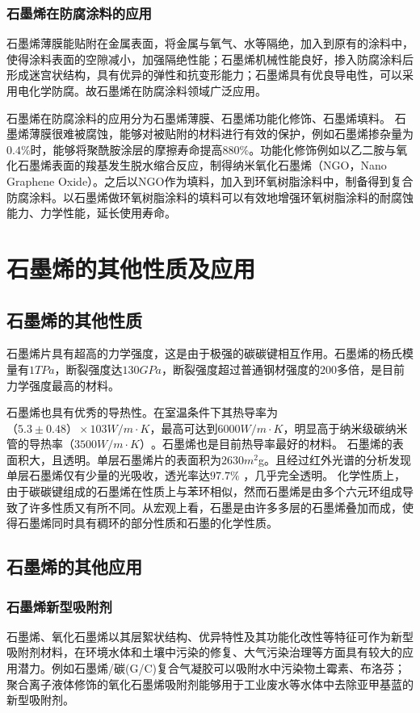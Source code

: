 \subsubsection{石墨烯在防腐涂料的应用}
石墨烯薄膜能贴附在金属表面，将金属与氧气、水等隔绝，加入到原有的涂料中，使得涂料表面的空隙减小，加强隔绝性能；石墨烯机械性能良好，掺入防腐涂料后形成迷宫状结构，具有优异的弹性和抗变形能力；石墨烯具有优良导电性，可以采用电化学防腐。故石墨烯在防腐涂料领域广泛应用。 \par
石墨烯在防腐涂料的应用分为石墨烯薄膜、石墨烯功能化修饰、石墨烯填料。
石墨烯薄膜很难被腐蚀，能够对被贴附的材料进行有效的保护，例如石墨烯掺杂量为$0.4\%$时，能够将聚酰胺涂层的摩擦寿命提高$880\%$。功能化修饰例如以乙二胺与氧化石墨烯表面的羧基发生脱水缩合反应，制得纳米氧化石墨烯（NGO，Nano Graphene Oxide）。之后以NGO作为填料，加入到环氧树脂涂料中，制备得到复合防腐涂料。以石墨烯做环氧树脂涂料的填料可以有效地增强环氧树脂涂料的耐腐蚀能力、力学性能，延长使用寿命。\cite{ref4} \par

\section{石墨烯的其他性质及应用}
\subsection{石墨烯的其他性质}
石墨烯片具有超高的力学强度，这是由于极强的碳碳键相互作用。石墨烯的杨氏模量有$1TPa$\cite{ref5}，断裂强度达$130GPa$，断裂强度超过普通钢材强度的$200$多倍\cite{ref6}，是目前力学强度最高的材料。\par
石墨烯也具有优秀的导热性。在室温条件下其热导率为$（5.3±0.48）×103 W/m \cdot K$，最高可达到$6000 W/m \cdot K$\cite{ref7}，明显高于纳米级碳纳米管的导热率$（3500  W/m \cdot K）$。石墨烯也是目前热导率最好的材料。
石墨烯的表面积大，且透明。单层石墨烯片的表面积为$2630m^{2}$g。且经过红外光谱的分析发现单层石墨烯仅有少量的光吸收，透光率达$97.7\%$ \cite{ref8,ref9}，几乎完全透明。
化学性质上，由于碳碳键组成的石墨烯在性质上与苯环相似，然而石墨烯是由多个六元环组成导致了许多性质又有所不同。从宏观上看，石墨是由许多多层的石墨烯叠加而成，使得石墨烯同时具有稠环的部分性质和石墨的化学性质。\par

\subsection{石墨烯的其他应用}
\subsubsection{石墨烯新型吸附剂}
石墨烯、氧化石墨烯以其层絮状结构、优异特性及其功能化改性等特征可作为新型吸附剂材料，在环境水体和土壤中污染的修复、大气污染治理等方面具有较大的应用潜力。例如石墨烯/碳(G/C)复合气凝胶可以吸附水中污染物土霉素、布洛芬；\cite{ref10}聚合离子液体修饰的氧化石墨烯吸附剂能够用于工业废水等水体中去除亚甲基蓝的新型吸附剂\cite{ref11}。\par
